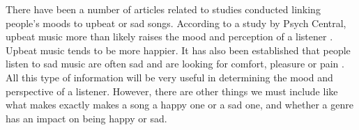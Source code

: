 \documentclass[12pt]{report}
\begin{document}
There have been a number of articles related to studies conducted linking people’s moods to upbeat or sad songs. According to a study by Psych Central, upbeat music more than likely raises the mood and perception of a listener \cite{Nauert2018}. Upbeat music tends to be more happier. It has also been established that people listen to sad music are often sad and are looking for comfort, pleasure or pain \cite{Eerola2016}. All this type of information will be very useful in determining the mood and perspective of a listener. However, there are other things we must include like what makes exactly makes a song a happy one or a sad one, and whether a genre has an impact on being happy or sad.

{}

\end{document}
